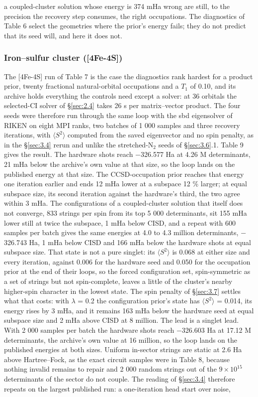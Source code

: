 \documentclass[11pt]{article}
\begin{document}
a coupled-cluster solution whose energy is 374 mHa wrong are still, to the precision the recovery step consumes, the right occupations. The diagnostics of Table 6 select the geometries where the prior's energy fails; they do not predict that its seed will, and here it does not.

\subsubsection{Iron--sulfur cluster ([4Fe-4S])}\label{sec:3.6.2}


The [4Fe-4S] run of Table 7 is the case the diagnostics rank hardest for a product prior, twenty fractional natural-orbital occupations and a $T_{1}$ of 0.10, and its archive holds everything the controls need except a solver: at 36 orbitals the selected-CI solver of \S\ref{sec:2.4} takes 26 s per matrix--vector product. The four seeds were therefore run through the same loop with the sbd eigensolver of RIKEN \cite{sbd} on eight MPI ranks, two batches of 1 000 samples and three recovery iterations, with $\langle S^{2}\rangle$ computed from the saved eigenvector and no spin penalty, as in the \S\ref{sec:3.4} rerun and unlike the stretched-N$_2$ seeds of \S\ref{sec:3.6}.1. Table 9 gives the result. The hardware shots reach $-$326.577 Ha at 4.26 M determinants, 21 mHa below the archive's own value at that size, so the loop lands on the published energy at that size. The CCSD-occupation prior reaches that energy one iteration earlier and ends 12 mHa lower at a subspace 12 \% larger; at equal subspace size, its second iteration against the hardware's third, the two agree within 3 mHa. The configurations of a coupled-cluster solution that itself does not converge, 833 strings per spin from its top 5 000 determinants, sit 155 mHa lower still at twice the subspace, 1 mHa below CISD, and a repeat with 600 samples per batch gives the same energies at 4.0 to 4.3 million determinants, $-$326.743 Ha, 1 mHa below CISD and 166 mHa below the hardware shots at equal subspace size. That state is not a pure singlet: its $\langle S^{2}\rangle$ is 0.068 at either size and every iteration, against 0.006 for the hardware seed and 0.050 for the occupation prior at the end of their loops, so the forced configuration set, spin-symmetric as a set of strings but not spin-complete, leaves a little of the cluster's nearby higher-spin character in the lowest state. The spin penalty of \S\ref{sec:3.7} settles what that costs: with $\lambda$ = 0.2 the configuration prior's state has $\langle S^{2}\rangle$ = 0.014, its energy rises by 3 mHa, and it remains 163 mHa below the hardware seed at equal subspace size and 2 mHa above CISD at 8 million. The lead is a singlet lead. With 2 000 samples per batch the hardware shots reach $-$326.603 Ha at 17.12 M determinants, the archive's own value at 16 million, so the loop lands on the published energies at both sizes. Uniform in-sector strings are static at 2.6 Ha above Hartree--Fock, as the exact circuit samples were in Table 8, because nothing invalid remains to repair and 2 000 random strings out of the $9\times10^{15}$ determinants of the sector do not couple. The reading of \S\ref{sec:3.4} therefore repeats on the largest published run: a one-iteration head start over noise, 
\end{document}
